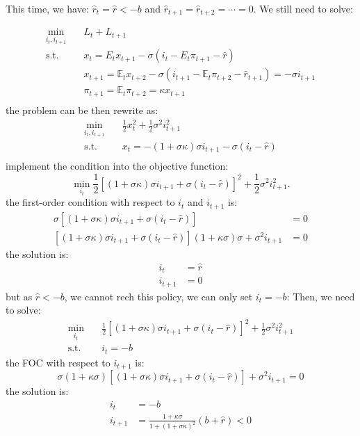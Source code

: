 \begin{solution}
    This time, we have: $\hat{r}_t = \hat{r} < -b$ and $\hat{r}_{t+1} = \hat{r}_{t+2} = \cdots = 0. $
    We still need to solve:
    
    \begin{align*}
        \min_{i_t, i_{t+1}} & \quad L_t + L_{t+1} \\
        \text{s.t.} & \quad x_t = E_t x_{t+1} - \sigma(i_t - E_t \pi_{t+1} - \hat{r}) \\
        & \quad x_{t+1} = \mathbb{E}_t x_{t+2} - \sigma(i_{t+1} - \mathbb{E}_t \pi_{t+2} - \hat{r}_{t+1} ) = -\sigma i_{t+1}\\
        & \quad \pi_{t+1} = \mathbb{E}_t \pi_{t+2}   = \kappa x_{t+1} \\
    \end{align*}
    the problem can be then rewrite as:
    \begin{align*}
        \min_{i_t, i_{t+1}} & \quad \frac{1}{2} x_t^2 + \frac{1}{2} \sigma^2 i_{t+1}^2 \\
        \text{s.t.} & \quad x_t = -(1+\sigma \kappa) \sigma i_{t+1}  - \sigma(i_t - \hat{r}) \\
    \end{align*}
    implement the condition into the objective function:
    \[
    \min_{i_t} \frac{1}{2} \left[(1+\sigma \kappa) \sigma i_{t+1} + \sigma(i_t - \hat{r})\right]^2 + \frac{1}{2} \sigma^2 i_{t+1}^2.
    \]
    the first-order condition with respect to $i_t$ and $i_{t+1} $ is:
    \begin{align*}
        \sigma \left[(1+\sigma \kappa) \sigma i_{t+1} + \sigma(i_t - \hat{r})\right] &= 0 \\
        \left[(1+\sigma \kappa) \sigma i_{t+1} + \sigma(i_t - \hat{r})\right](1+\kappa \sigma)\sigma + \sigma ^2 i_{t+1}  &= 0
    \end{align*}
    the solution is:
    \begin{align*}
        i_t &= \hat{r} \\
        i_{t+1} &= 0
    \end{align*}
    but as $\hat{r} < -b$, we cannot rech this policy, we can only set $i_t = -b$:
    Then, we need to solve:
    \begin{align*}
        \min_{i_t} & \quad \frac{1}{2} \left[(1+\sigma \kappa) \sigma i_{t+1} + \sigma(i_t - \hat{r})\right]^2 + \frac{1}{2} \sigma^2 i_{t+1}^2 \\
        \text{s.t.} & \quad i_t = -b
    \end{align*}
    the FOC with respect to $i_{t+1}$ is:
    \[
    \sigma(1+\kappa \sigma) \left[(1+\sigma \kappa) \sigma i_{t+1} + \sigma(i_t - \hat{r})\right] + \sigma^2 i_{t+1}  = 0
    \]
    the solution is:
    \begin{align*}
        i_t &= -b \\
        i_{t+1} &= \frac{1+\kappa \sigma}{1+(1+\sigma \kappa)^2} (b + \hat{r})<0
    \end{align*}
\end{solution}
